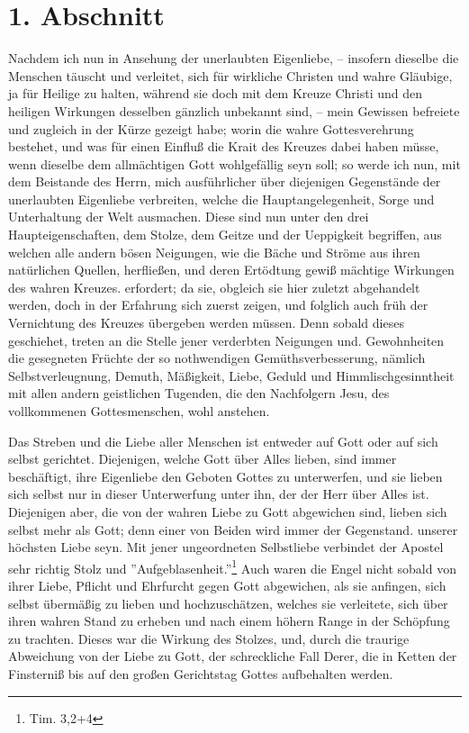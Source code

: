 \section{1. Abschnitt}

Nachdem ich nun in Ansehung der unerlaubten Eigenliebe, -- insofern dieselbe die Menschen täuscht und verleitet, sich für wirkliche Christen und wahre Gläubige, ja für Heilige zu halten, während sie doch mit dem Kreuze Christi und den heiligen Wirkungen desselben gänzlich unbekannt sind, -- mein Gewissen befreiete und zugleich in der Kürze gezeigt habe; worin die wahre Gottesverehrung bestehet, und was für einen Einfluß die Krait des Kreuzes dabei haben müsse, wenn dieselbe dem allmächtigen Gott wohlgefällig seyn soll; so werde ich nun, mit dem Beistande des Herrn, mich ausführlicher über diejenigen Gegenstände der unerlaubten Eigenliebe verbreiten, welche die Hauptangelegenheit, Sorge und Unterhaltung der Welt ausmachen. Diese sind nun unter den drei Haupteigenschaften, dem Stolze, dem Geitze und der Ueppigkeit begriffen, aus welchen alle andern bösen Neigungen, wie die Bäche und Ströme aus ihren natürlichen Quellen, herfließen, und deren Ertödtung gewiß mächtige Wirkungen des wahren Kreuzes. erfordert; da sie, obgleich sie hier zuletzt abgehandelt werden, doch in der Erfahrung sich zuerst zeigen, und folglich auch früh der Vernichtung des Kreuzes übergeben werden müssen. Denn sobald dieses geschiehet, treten an die Stelle jener verderbten Neigungen und. Gewohnheiten die gesegneten Früchte der so nothwendigen Gemüthsverbesserung, nämlich Selbstverleugnung, Demuth, Mäßigkeit, Liebe, Geduld und Himmlischgesinntheit mit allen andern geistlichen Tugenden, die den Nachfolgern Jesu, des vollkommenen Gottesmenschen, wohl anstehen.


Das Streben und die Liebe aller Menschen ist entweder auf Gott oder auf sich selbst gerichtet. Diejenigen, welche Gott über Alles lieben, sind immer beschäftigt, ihre Eigenliebe den Geboten Gottes zu unterwerfen, und sie lieben sich selbst nur in dieser Unterwerfung unter ihn, der der Herr über Alles ist. Diejenigen aber, die von der wahren Liebe zu Gott abgewichen sind, lieben sich selbst mehr als Gott; denn einer von Beiden wird immer der Gegenstand. unserer höchsten Liebe seyn. Mit jener ungeordneten Selbstliebe verbindet der Apostel sehr richtig Stolz und ''Aufgeblasenheit.''\footnote{Tim. 3,2+4} Auch waren die Engel nicht sobald von ihrer Liebe, Pflicht und Ehrfurcht gegen Gott abgewichen, als sie anfingen, sich selbst übermäßig zu lieben und hochzuschätzen, welches sie verleitete, sich über ihren wahren Stand zu erheben und nach einem höhern Range in der Schöpfung zu trachten. Dieses war die Wirkung des Stolzes, und, durch die traurige Abweichung von der Liebe zu Gott, der schreckliche Fall Derer, die in Ketten der Finsterniß bis auf den großen Gerichtstag Gottes aufbehalten werden.

